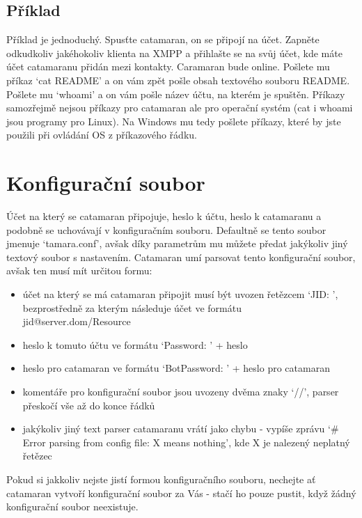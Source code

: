 \documentclass[a4paper,11pt,titlepage]{article}
\begin{document}
\subsection{Příklad}
Příklad je jednoduchý. Spusťte catamaran, on se připojí na účet. Zapněte odkudkoliv jakéhokoliv klienta na XMPP a přihlašte se na svůj účet, kde máte účet catamaranu přidán mezi kontakty.
Caramaran bude online. Pošlete mu příkaz `cat README' a on vám zpět pošle obsah textového souboru README. Pošlete mu `whoami' a on vám pošle název účtu, na kterém je spuštěn. Příkazy
samozřejmě nejsou příkazy pro catamaran ale pro operační systém (cat i whoami jsou programy pro Linux). Na Windows mu tedy pošlete příkazy, které by jste použili při ovládání OS z příkazového
řádku.
\newpage
\section{Konfigurační soubor}
\label{konfigurak}
Účet na který se catamaran připojuje, heslo k účtu, heslo k catamaranu a podobně se uchovávají v konfiguračním souboru. Defaultně se tento soubor jmenuje `tamara.conf', avšak díky parametrům
mu můžete předat jakýkoliv jiný textový soubor s nastavením. Catamaran umí parsovat tento konfigurační soubor, avšak ten musí mít určitou formu:
\begin{itemize}
\item účet na který se má catamaran připojit musí být uvozen řetězcem `JID: ', bezprostředně za kterým následuje účet ve formátu \\ jid@server.dom/Resource
\item heslo k tomuto účtu ve formátu `Password: ' + heslo
\item heslo pro catamaran ve formátu `BotPassword: ' + heslo pro catamaran
\item komentáře pro konfigurační soubor jsou uvozeny dvěma znaky `//', parser přeskočí vše až do konce řádků
\item jakýkoliv jiný text parser catamaranu vrátí jako chybu - vypíše zprávu `\# Error parsing from config file: X means nothing', kde X je nalezený neplatný řetězec
\end{itemize}
Pokud si jakkoliv nejste jistí formou konfiguračního souboru, nechejte ať catamaran vytvoří konfigurační soubor za Vás - stačí ho pouze pustit, když žádný konfigurační soubor neexistuje.
\end{document}
